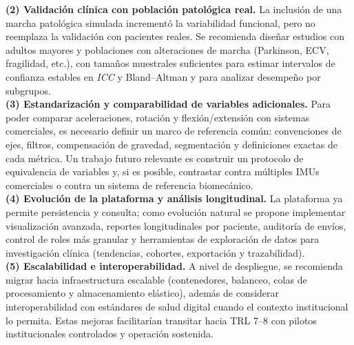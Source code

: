 \documentclass[12pt]{report}
\begin{document}
\begin{justify}
    \textbf{(2) Validación clínica con población patológica real.}
    La inclusión de una marcha patológica simulada incrementó la variabilidad funcional, pero no reemplaza la validación con pacientes reales. Se recomienda diseñar estudios con adultos mayores y poblaciones con alteraciones de marcha (Parkinson, ECV, fragilidad, etc.), con tamaños muestrales suficientes para estimar intervalos de confianza estables en \textit{ICC} y Bland--Altman y para analizar desempeño por subgrupos.\\

    \textbf{(3) Estandarización y comparabilidad de variables adicionales.}
    Para poder comparar aceleraciones, rotación y flexión/extensión con sistemas comerciales, es necesario definir un marco de referencia común: convenciones de ejes, filtros, compensación de gravedad, segmentación y definiciones exactas de cada métrica. Un trabajo futuro relevante es construir un protocolo de equivalencia de variables y, si es posible, contrastar contra múltiples IMUs comerciales o contra un sistema de referencia biomecánico.\\

    \textbf{(4) Evolución de la plataforma y análisis longitudinal.}
    La plataforma ya permite persistencia y consulta; como evolución natural se propone implementar visualización avanzada, reportes longitudinales por paciente, auditoría de envíos, control de roles más granular y herramientas de exploración de datos para investigación clínica (tendencias, cohortes, exportación y trazabilidad).\\

    \textbf{(5) Escalabilidad e interoperabilidad.}
    A nivel de despliegue, se recomienda migrar hacia infraestructura escalable (contenedores, balanceo, colas de procesamiento y almacenamiento elástico), además de considerar interoperabilidad con estándares de salud digital cuando el contexto institucional lo permita. Estas mejoras facilitarían transitar hacia TRL 7--8 con pilotos institucionales controlados y operación sostenida.\\
    \clearpage







\end{justify}




\end{document}
